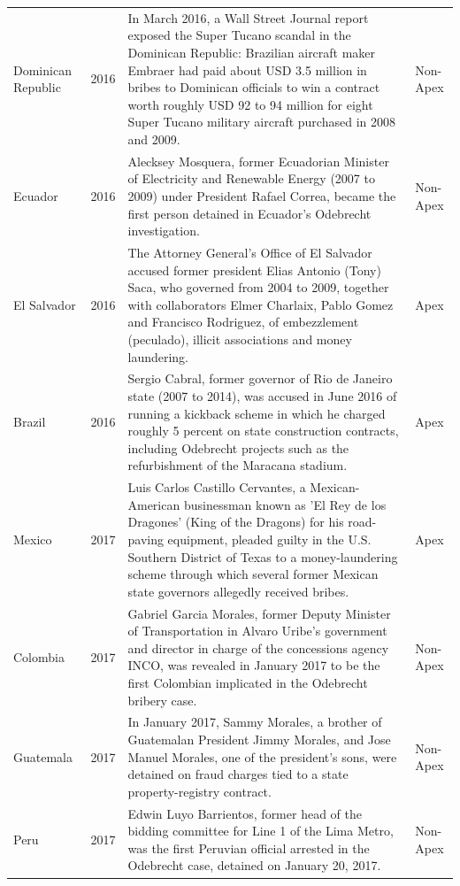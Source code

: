 \begin{landscape}
\begin{longtable}{@{}l c p{15.5cm} l@{}}
Dominican Republic & 2016 & In March 2016, a Wall Street Journal report exposed the Super Tucano scandal in the Dominican Republic: Brazilian aircraft maker Embraer had paid about USD 3.5 million in bribes to Dominican officials to win a contract worth roughly USD 92 to 94 million for eight Super Tucano military aircraft purchased in 2008 and 2009. & Non-Apex \\
Ecuador & 2016 & Alecksey Mosquera, former Ecuadorian Minister of Electricity and Renewable Energy (2007 to 2009) under President Rafael Correa, became the first person detained in Ecuador's Odebrecht investigation. & Non-Apex \\
El Salvador & 2016 & The Attorney General's Office of El Salvador accused former president Elias Antonio (Tony) Saca, who governed from 2004 to 2009, together with collaborators Elmer Charlaix, Pablo Gomez and Francisco Rodriguez, of embezzlement (peculado), illicit associations and money laundering. & Apex \\
Brazil & 2016 & Sergio Cabral, former governor of Rio de Janeiro state (2007 to 2014), was accused in June 2016 of running a kickback scheme in which he charged roughly 5 percent on state construction contracts, including Odebrecht projects such as the refurbishment of the Maracana stadium. & Apex \\
Mexico & 2017 & Luis Carlos Castillo Cervantes, a Mexican-American businessman known as 'El Rey de los Dragones' (King of the Dragons) for his road-paving equipment, pleaded guilty in the U.S. Southern District of Texas to a money-laundering scheme through which several former Mexican state governors allegedly received bribes. & Apex \\
Colombia & 2017 & Gabriel Garcia Morales, former Deputy Minister of Transportation in Alvaro Uribe's government and director in charge of the concessions agency INCO, was revealed in January 2017 to be the first Colombian implicated in the Odebrecht bribery case. & Non-Apex \\
Guatemala & 2017 & In January 2017, Sammy Morales, a brother of Guatemalan President Jimmy Morales, and Jose Manuel Morales, one of the president's sons, were detained on fraud charges tied to a state property-registry contract. & Non-Apex \\
Peru & 2017 & Edwin Luyo Barrientos, former head of the bidding committee for Line 1 of the Lima Metro, was the first Peruvian official arrested in the Odebrecht case, detained on January 20, 2017. & Non-Apex \\

\end{longtable}
\end{landscape}
